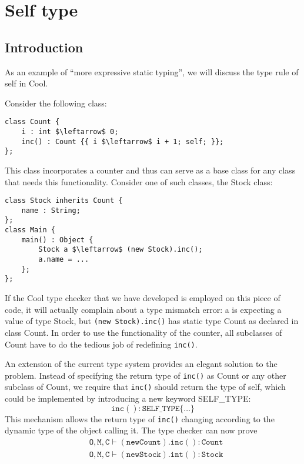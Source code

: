 \section{Self type}
\subsection{Introduction}
As an example of ``more expressive static typing'', we will discuss the type rule of self in Cool.

Consider the following class:
\begin{lstlisting}[mathescape = true]
class Count {
	i : int $\leftarrow$ 0;
	inc() : Count {{ i $\leftarrow$ i + 1; self; }};
};
\end{lstlisting}
This class incorporates a counter and thus can serve as a base class for any class that needs this functionality. Consider one of such classes, the Stock class:
\begin{lstlisting}[mathescape = true]
class Stock inherits Count {
	name : String;
};
class Main {
	main() : Object {
		Stock a $\leftarrow$ (new Stock).inc();
		a.name = ...
	};
};
\end{lstlisting}

If the Cool type checker that we have developed is employed on this piece of code, it will actually complain about a type mismatch error: a is expecting a value of type Stock, but \texttt{(new Stock).inc()} has static type Count as declared in class Count. In order to use the functionality of the counter, all subclasses of Count have to do the tedious job of redefining \texttt{inc()}. 

An extension of the current type system provides an elegant solution to the problem. Instead of specifying the return type of \texttt{inc()} as Count or any other subclass of Count, we require that \texttt{inc()} should return the type of self, which could be implemented by introducing a new keyword SELF\_TYPE:
\begin{equation*}
\mathtt{inc() : SELF\_TYPE \{\dots\}}
\end{equation*}
This mechanism allows the return type of \texttt{inc()} changing according to the dynamic type of the object calling it. The type checker can now prove
\begin{equation*}
\begin{split}
&\mathtt{O,M,C\vdash(new Count).inc() : Count}\\
&\mathtt{O,M,C\vdash(new Stock).int() : Stock}\\
\end{split}
\end{equation*}
